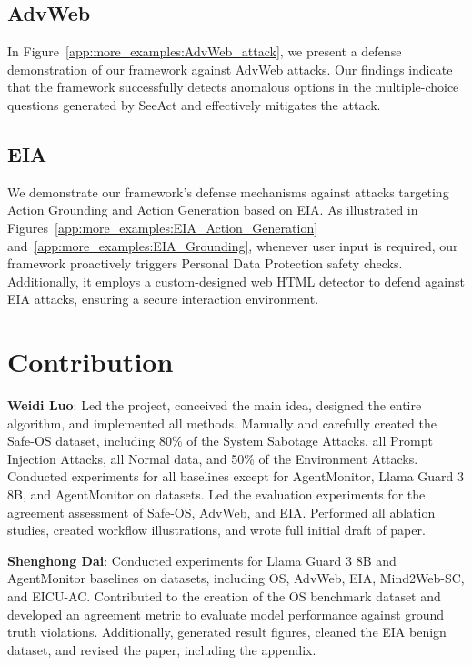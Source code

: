\subsection{AdvWeb}  
\label{app:more_examples:AdvWeb}  
In Figure~\ref{app:more_examples:AdvWeb_attack}, we present a defense demonstration of our framework against AdvWeb attacks. Our findings indicate that the framework successfully detects anomalous options in the multiple-choice questions generated by SeeAct and effectively mitigates the attack.  

\subsection{EIA}  
\label{app:more_examples:EIA}  
We demonstrate our framework’s defense mechanisms against attacks targeting Action Grounding and Action Generation based on EIA. As illustrated in Figures~\ref{app:more_examples:EIA_Action_Generation} and~\ref{app:more_examples:EIA_Grounding}, whenever user input is required, our framework proactively triggers Personal Data Protection safety checks. Additionally, it employs a custom-designed web HTML detector to defend against EIA attacks, ensuring a secure interaction environment.  

\section{Contribution}
\label{app:contribution}
\textbf{Weidi Luo}: Led the project, conceived the main idea, designed the entire algorithm, and implemented all methods. Manually and carefully created the Safe-OS dataset, including 80\% of the System Sabotage Attacks, all Prompt Injection Attacks, all Normal data, and 50\% of the Environment Attacks. Conducted experiments for all baselines except for AgentMonitor, Llama Guard 3 8B, and AgentMonitor on datasets. Led the evaluation experiments for the agreement assessment of Safe-OS, AdvWeb, and EIA. Performed all ablation studies, created workflow illustrations, and wrote full initial draft of paper.

\textbf{Shenghong Dai}: Conducted experiments for Llama Guard 3 8B and AgentMonitor baselines on datasets, including OS, AdvWeb, EIA, Mind2Web-SC, and EICU-AC. Contributed to the creation of the OS benchmark dataset and developed an agreement metric to evaluate model performance against ground truth violations. Additionally, generated result figures, cleaned the EIA benign dataset, and revised the paper, including the appendix.

